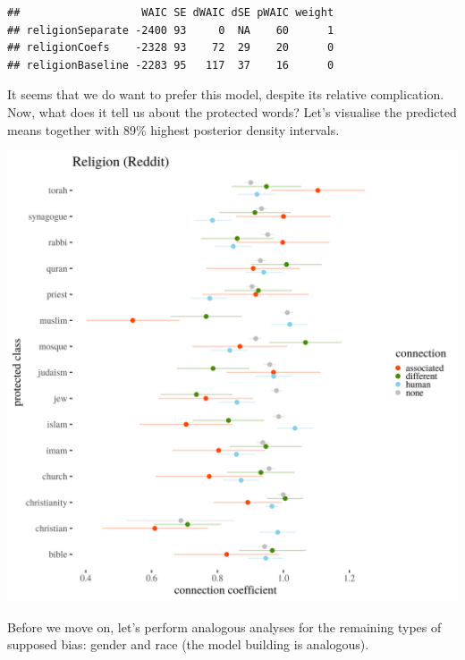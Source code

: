\documentclass[12pt,]{book}
\begin{document}
\begin{verbatim}
##                   WAIC SE dWAIC dSE pWAIC weight
## religionSeparate -2400 93     0  NA    60      1
## religionCoefs    -2328 93    72  29    20      0
## religionBaseline -2283 95   117  37    16      0
\end{verbatim}

\normalsize

It seems that we do want to prefer this model, despite its relative
complication. Now, what does it tell us about the protected words? Let's
visualise the predicted means together with 89\% highest posterior
density intervals.

\includegraphics[width=14cm]{../images/visReligionReddit.png}

Before we move on, let's perform analogous analyses for the remaining
types of supposed bias: gender and race (the model building is
analogous).
\end{document}
